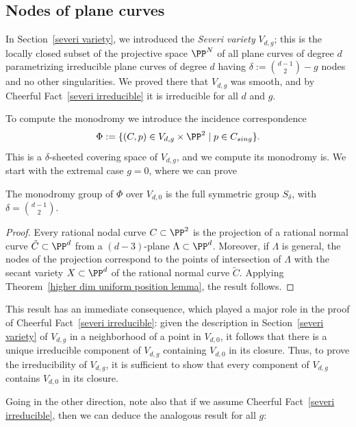 \subsection{Nodes of plane curves}\label{plane curve nodes}

In Section~\ref{severi variety}, we introduced the \emph{Severi variety} $V_{d,g}$; this is the locally closed subset of the projective space $\PP^N$ of all plane curves of degree $d$ parametrizing irreducible plane curves of degree $d$ having $\delta := \binom{d-1}{2} - g$ nodes and no other singularities. We proved there that $V_{d,g}$ was smooth, and by Cheerful Fact~\ref{severi irreducible} it is irreducible for all $d$ and $g$. 

To compute the monodromy we introduce the incidence correspondence
$$
\Phi := \{(C, p) \in V_{d,g} \times \PP^2 \mid p \in C_{sing} \}.
$$ 
This is a $\delta$-sheeted covering space of $V_{d,g}$, and we compute its monodromy is. We start with the extremal case $g = 0$, where we can prove

\begin{proposition}
The monodromy group of $\Phi$ over $V_{d,0}$ is the full symmetric group $S_\delta$, with $\delta = \binom{d-1}{2}$.
\end{proposition}

\begin{proof}
Every rational nodal curve $C \subset \PP^2$ is the projection of a rational normal curve $\tilde C \subset \PP^d$ from a $(d-3)$-plane $\Lambda \subset \PP^d$. Moreover, if $\Lambda$ is general,  the nodes of the projection correspond to the points of intersection of $\Lambda$ with the  secant variety $X \subset \PP^d$ of the rational normal curve $\tilde C$. Applying Theorem~\ref{higher dim uniform position lemma}, the result follows.
\end{proof}

This result has an immediate consequence, which played a major role in the proof of Cheerful Fact~\ref{severi irreducible}: given the description in Section~\ref{severi variety} of $V_{d,g}$ in a neighborhood of a point in $V_{d,0}$, it follows that there is a unique irreducible component of $V_{d,g}$ containing $V_{d,0}$ in its closure. Thus, to prove the irreducibility of $V_{d,g}$, it is sufficient to show that every component of $V_{d,g}$ contains $V_{d,0}$ in its closure. 

Going in the other direction, note also that if we assume Cheerful Fact~\ref{severi irreducible}, then we can deduce the analogous result for all $g$:


